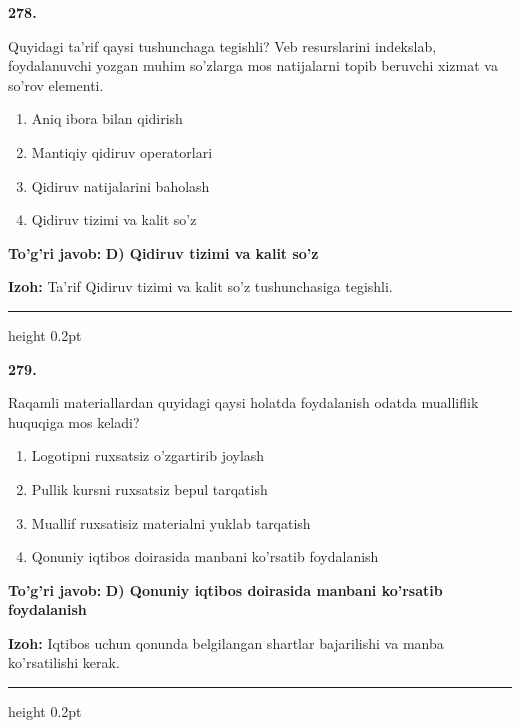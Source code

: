 \documentclass[10pt,a4paper,oneside]{article}
\begin{document}
\noindent\textbf{\color{ink}278.}
\par
Quyidagi ta'rif qaysi tushunchaga tegishli? Veb resurslarini indekslab, foydalanuvchi yozgan muhim so'zlarga mos natijalarni topib beruvchi xizmat va so'rov elementi.
\begin{enumerate}[label=\Alph*),leftmargin=9mm]
\item Aniq ibora bilan qidirish
\item Mantiqiy qidiruv operatorlari
\item Qidiruv natijalarini baholash
\item Qidiruv tizimi va kalit so'z
\end{enumerate}
\begin{tcolorbox}[enhanced,breakable,colback=teal!4,colframe=teal!50!black,boxrule=0.5pt,arc=1.1mm,left=3mm,right=3mm,top=1.7mm,bottom=1.7mm,before skip=2mm,after skip=2mm]
\textbf{\color{teal}To'g'ri javob:} \textbf{D) Qidiruv tizimi va kalit so'z}
\par\smallskip
\textbf{Izoh:} Ta'rif Qidiruv tizimi va kalit so'z tushunchasiga tegishli.
\end{tcolorbox}
\vspace{2mm}\hrule height 0.2pt \vspace{3mm}

\noindent\textbf{\color{ink}279.}
\par
Raqamli materiallardan quyidagi qaysi holatda foydalanish odatda mualliflik huquqiga mos keladi?
\begin{enumerate}[label=\Alph*),leftmargin=9mm]
\item Logotipni ruxsatsiz o'zgartirib joylash
\item Pullik kursni ruxsatsiz bepul tarqatish
\item Muallif ruxsatisiz materialni yuklab tarqatish
\item Qonuniy iqtibos doirasida manbani ko'rsatib foydalanish
\end{enumerate}
\begin{tcolorbox}[enhanced,breakable,colback=teal!4,colframe=teal!50!black,boxrule=0.5pt,arc=1.1mm,left=3mm,right=3mm,top=1.7mm,bottom=1.7mm,before skip=2mm,after skip=2mm]
\textbf{\color{teal}To'g'ri javob:} \textbf{D) Qonuniy iqtibos doirasida manbani ko'rsatib foydalanish}
\par\smallskip
\textbf{Izoh:} Iqtibos uchun qonunda belgilangan shartlar bajarilishi va manba ko'rsatilishi kerak.
\end{tcolorbox}
\vspace{2mm}\hrule height 0.2pt \vspace{3mm}
\end{document}
